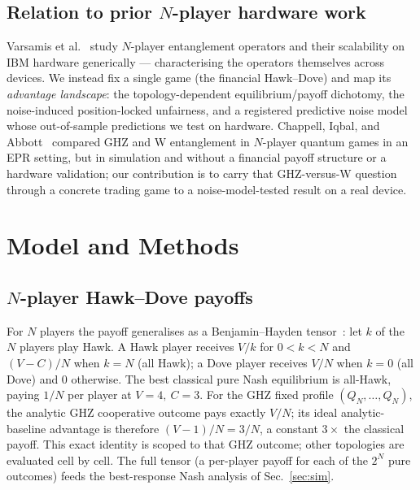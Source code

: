 \documentclass[conference]{IEEEtran}
\begin{document}
\subsection{Relation to prior $N$-player hardware work}
Varsamis et al.~\cite{varsamis2025} study $N$-player entanglement operators
and their scalability on IBM hardware generically --- characterising the
operators themselves across devices. We instead fix a single game (the
financial Hawk--Dove) and map its \emph{advantage landscape}: the
topology-dependent equilibrium/payoff dichotomy, the noise-induced
position-locked unfairness, and a registered predictive noise model whose
out-of-sample predictions we test on hardware. Chappell, Iqbal, and
Abbott~\cite{chappell2012} compared GHZ and W entanglement in $N$-player
quantum games in an EPR setting, but in simulation and without a financial
payoff structure or a hardware validation; our contribution is to carry that
GHZ-versus-W question through a concrete trading game to a noise-model-tested
result on a real device.

\section{Model and Methods}\label{sec:model}

\subsection{$N$-player Hawk--Dove payoffs}
For $N$ players the payoff generalises as a Benjamin--Hayden
tensor~\cite{benjamin2001}: let $k$ of the $N$ players play Hawk. A Hawk
player receives $V/k$ for $0<k<N$ and $(V{-}C)/N$ when $k=N$ (all Hawk); a
Dove player receives $V/N$ when $k=0$ (all Dove) and $0$ otherwise. The best
classical pure Nash equilibrium is all-Hawk, paying $1/N$ per player at
$V{=}4,\ C{=}3$. For the GHZ fixed profile $(Q_N,\dots,Q_N)$, the analytic
GHZ cooperative outcome pays exactly $V/N$; its ideal analytic-baseline
advantage is therefore $(V{-}1)/N=3/N$, a constant $3\times$ the classical
payoff. This exact identity is scoped to that GHZ outcome; other topologies
are evaluated cell by cell. The full tensor (a per-player payoff for each of
the $2^N$ pure outcomes) feeds the best-response Nash analysis of
Sec.~\ref{sec:sim}.
\end{document}

